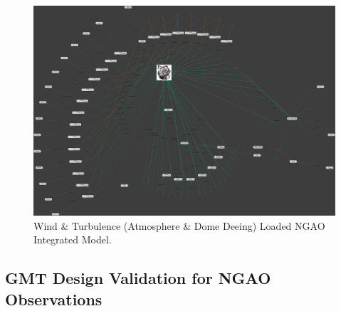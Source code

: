 \documentclass[]{AO4ELT}  %
\begin{document}
\begin{figure}
   \centering
   \includegraphics[width=\linewidth]{ngao-opm.2pi.png}
   \caption{Wind \& Turbulence (Atmosphere \& Dome Deeing) Loaded NGAO Integrated Model.}
   \label{fig:17}
\end{figure}

\subsection{GMT Design Validation for NGAO Observations}
\label{sec:gmt-ngao-vv}
\end{document}
